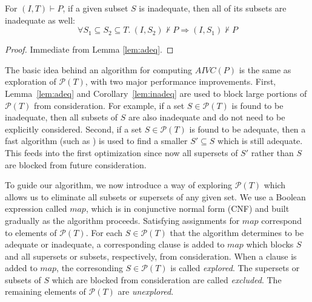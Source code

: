\begin{corollary}
\label{lem:inadeq}
For $(I, T) \vdash P$, if a given subset $S$ is inadequate, then all of its subsets are inadequate as well:
\allowbreak $$\forall S_1 \subseteq S_2 \subseteq T.~ (I, S_2) \nvdash P \Rightarrow (I, S_1) \nvdash P$$
\end{corollary}
\begin{proof}
  Immediate from Lemma \ref{lem:adeq}.
\end{proof}


The basic idea behind an algorithm for computing $AIVC(P)$ is the same
as exploration of $\mathcal{P}(T)$, with two major performance
improvements. First, Lemma~\ref{lem:adeq} and
Corollary~\ref{lem:inadeq} are used to block large portions of
$\mathcal{P}(T)$ from consideration. For example, if a set $S \in
\mathcal{P}(T)$ is found to be inadequate, then all subsets of $S$ are
also inadequate and do not need to be explicitly considered. Second,
if a set $S \in \mathcal{P}(T)$ is found to be adequate, then a fast
algorithm (such as \ucalg) is used to find a
smaller $S' \subseteq S$ which is still adequate. This feeds into the
first optimization since now all supersets of $S'$ rather than $S$ are
blocked from future consideration.

To guide our algorithm, we now introduce a way of exploring
$\mathcal{P}(T)$ which allows us to eliminate all subsets or supersets
of any given set. We use a Boolean expression called $map$, which is
in conjunctive normal form (CNF) and built gradually as the algorithm
proceeds. Satisfying assignments for $map$ correspond to elements of
$\mathcal{P}(T)$. For each $S \in \mathcal{P}(T)$ that the algorithm
determines to be adequate or inadequate, a corresponding clause is
added to $map$ which blocks $S$ and all supersets or subsets,
respectively, from consideration. When a clause is added to $map$, the
corresonding $S \in \mathcal{P}(T)$ is called \emph{explored}.
The supersets or subsets of $S$ which are blocked from
consideration are called \emph{excluded}. The remaining elements
of $\mathcal{P}(T)$ are \emph{unexplored}.

